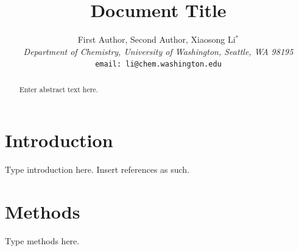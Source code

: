 \documentclass[12pt]{article}
\begin{document}
\title{Document Title}
\author{First Author, Second Author, Xiaosong Li$^*$ \\[12pt]
\emph{Department of Chemistry, University of Washington, Seattle, WA 98195} \\[12pt]
\texttt{email: li@chem.washington.edu}}
\date{}
\maketitle

\begin{abstract}
	Enter abstract text here.
\end{abstract}
\newpage

\section*{Introduction}

Type introduction here.  Insert references as such.\cite{Li12_2898, Li12_22A512, Li12_1374, Li12_11223, Li11_144102, Li11_024118, Li06_835, GDVH21}

\section*{Methods}

Type methods here.

\end{document}
